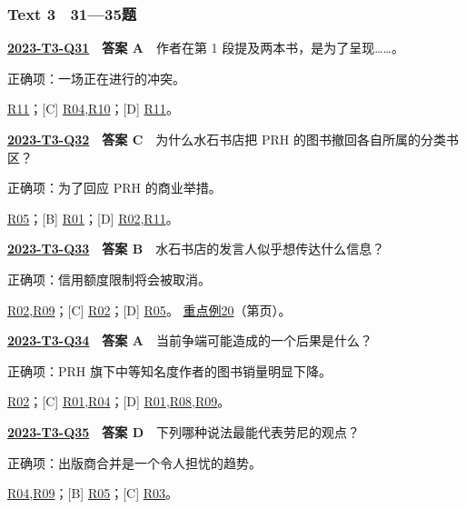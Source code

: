 \documentclass[11pt,a4paper]{article}
\begin{document}
\subsubsection{Text 3　31—35题}
\label{idx-2023-T3-Q31}
\noindent\textbf{\href{https://zj139.github.io/math-notes/english/0b41d98590bdcf819b5d5556/\#q31}{2023-T3-Q31}　答案 A}　作者在第 1 段提及两本书，是为了呈现……。\par\nopagebreak
\noindent 正确项：一场正在进行的冲突。\par\nopagebreak
\noindent [B] \hyperref[cat-R11]{R11}；[C] \hyperref[cat-R04]{R04},\hyperref[cat-R10]{R10}；[D] \hyperref[cat-R11]{R11}。
\par\smallskip
{}\label{idx-2023-T3-Q32}
\noindent\textbf{\href{https://zj139.github.io/math-notes/english/0b41d98590bdcf819b5d5556/\#q32}{2023-T3-Q32}　答案 C}　为什么水石书店把 PRH 的图书撤回各自所属的分类书区？\par\nopagebreak
\noindent 正确项：为了回应 PRH 的商业举措。\par\nopagebreak
\noindent [A] \hyperref[cat-R05]{R05}；[B] \hyperref[cat-R01]{R01}；[D] \hyperref[cat-R02]{R02},\hyperref[cat-R11]{R11}。
\par\smallskip
{}\label{idx-2023-T3-Q33}
\noindent\textbf{\href{https://zj139.github.io/math-notes/english/0b41d98590bdcf819b5d5556/\#q33}{2023-T3-Q33}　答案 B}　水石书店的发言人似乎想传达什么信息？\par\nopagebreak
\noindent 正确项：信用额度限制将会被取消。\par\nopagebreak
\noindent [A] \hyperref[cat-R02]{R02},\hyperref[cat-R09]{R09}；[C] \hyperref[cat-R02]{R02}；[D] \hyperref[cat-R05]{R05}。
\hyperref[case-2023-T3-Q33]{重点例20}（第\pageref{case-2023-T3-Q33}页）。
\par\smallskip
{}\label{idx-2023-T3-Q34}
\noindent\textbf{\href{https://zj139.github.io/math-notes/english/0b41d98590bdcf819b5d5556/\#q34}{2023-T3-Q34}　答案 A}　当前争端可能造成的一个后果是什么？\par\nopagebreak
\noindent 正确项：PRH 旗下中等知名度作者的图书销量明显下降。\par\nopagebreak
\noindent [B] \hyperref[cat-R02]{R02}；[C] \hyperref[cat-R01]{R01},\hyperref[cat-R04]{R04}；[D] \hyperref[cat-R01]{R01},\hyperref[cat-R08]{R08},\hyperref[cat-R09]{R09}。
\par\smallskip
{}\label{idx-2023-T3-Q35}
\noindent\textbf{\href{https://zj139.github.io/math-notes/english/0b41d98590bdcf819b5d5556/\#q35}{2023-T3-Q35}　答案 D}　下列哪种说法最能代表劳尼的观点？\par\nopagebreak
\noindent 正确项：出版商合并是一个令人担忧的趋势。\par\nopagebreak
\noindent [A] \hyperref[cat-R04]{R04},\hyperref[cat-R09]{R09}；[B] \hyperref[cat-R05]{R05}；[C] \hyperref[cat-R03]{R03}。
\par\smallskip
\end{document}
